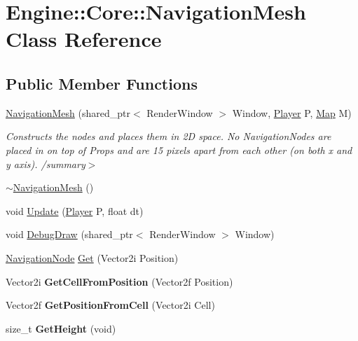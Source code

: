 \hypertarget{class_engine_1_1_core_1_1_navigation_mesh}{}\section{Engine\+:\+:Core\+:\+:Navigation\+Mesh Class Reference}
\label{class_engine_1_1_core_1_1_navigation_mesh}
\subsection*{Public Member Functions}
\begin{DoxyCompactItemize}
\item 
\hyperlink{class_engine_1_1_core_1_1_navigation_mesh_a7c1d1dfb88aeb8d53a9d99bca5e67a66}{Navigation\+Mesh} (shared\+\_\+ptr$<$ Render\+Window $>$ Window, \hyperlink{class_engine_1_1_game_play_1_1_player}{Player} P, \hyperlink{class_engine_1_1_core_1_1_map}{Map} M)
\begin{DoxyCompactList}\small\item\em Constructs the nodes and places them in 2D space. No Navigation\+Nodes are placed in on top of Props and are 15 pixels apart from each other (on both x and y axis). /summary$>$ \end{DoxyCompactList}\item 
\hyperlink{class_engine_1_1_core_1_1_navigation_mesh_af050cbb93dae59dd8262d5aa5615407c}{$\sim$\+Navigation\+Mesh} ()
\item 
void \hyperlink{class_engine_1_1_core_1_1_navigation_mesh_a5f2b7d3b8c7e5ea747f9d8a7c5b432e5}{Update} (\hyperlink{class_engine_1_1_game_play_1_1_player}{Player} P, float dt)
\item 
void \hyperlink{class_engine_1_1_core_1_1_navigation_mesh_a86758b74b81e8e48ddbf14466e8e9325}{Debug\+Draw} (shared\+\_\+ptr$<$ Render\+Window $>$ Window)
\item 
\hyperlink{struct_engine_1_1_core_1_1_navigation_node}{Navigation\+Node} \hyperlink{class_engine_1_1_core_1_1_navigation_mesh_a48becc9e01e0a8411c095ff1cc31a372}{Get} (Vector2i Position)
\item 
\mbox{\label{class_engine_1_1_core_1_1_navigation_mesh_a4b8b8efb92039c8b9dbda95796b79d4a}} 
Vector2i {\bfseries Get\+Cell\+From\+Position} (Vector2f Position)
\item 
\mbox{\label{class_engine_1_1_core_1_1_navigation_mesh_ab066006c43b8eff112625e293d81a823}} 
Vector2f {\bfseries Get\+Position\+From\+Cell} (Vector2i Cell)
\item 
\mbox{\label{class_engine_1_1_core_1_1_navigation_mesh_a83a641e4c4dc36d067cff04188f95a78}} 
size\+\_\+t {\bfseries Get\+Height} (void)
\end{DoxyCompactItemize}


